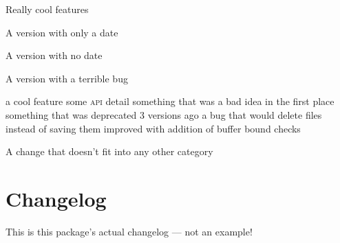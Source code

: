 \documentclass{ltxdoc}
\begin{document}
\begin{latexcode}
\usepackage[color]{changelog}
\begin{changelog}[author=Rebecca Turner,
	sectioncmd=\subsection,
	title=Example changelog]
\begin{version}
	\added Really cool features
\end{version}

\begin{version}[date=2019-01-23]
	\item A version with only a date
\end{version}

\begin{version}[v=1.1.0]
	\item A version with no date
\end{version}

\begin{version}[v=1.0.1, yanked]
	\item A version with a terrible bug
\end{version}

\begin{version}[v=1.0.0, date=2018-10-26]
	\added a cool feature
	\changed some \textsc{api} detail
	\deprecated something that was a bad idea in the first place
	\removed something that was deprecated 3 versions ago
	\fixed a bug that would delete files instead of saving them
	\security improved with addition of buffer bound checks
	\item A change that doesn't fit into any other category
\end{version}
\end{changelog}
\end{latexcode}

\section{Changelog}

This is this package's actual changelog --- not an example!

\begin{changelog}[author=Rebecca Turner, section=false]
\end{changelog}

\PrintIndex
\listoftables
\end{document}
